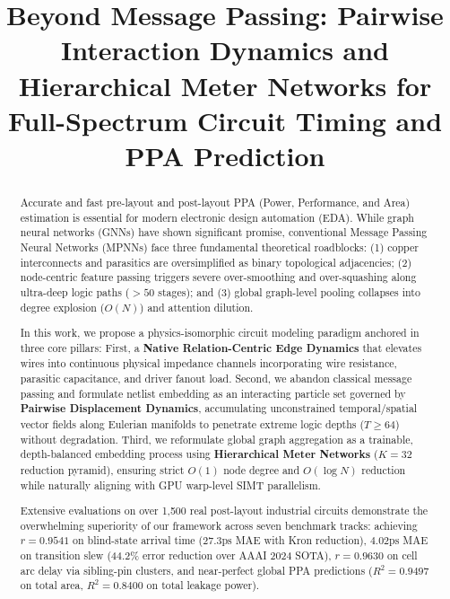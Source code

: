 \documentclass[conference]{IEEEtran}
\begin{document}
\title{Beyond Message Passing: Pairwise Interaction Dynamics and Hierarchical Meter Networks for Full-Spectrum Circuit Timing and PPA Prediction}

\author{}

\maketitle

\begin{abstract}
Accurate and fast pre-layout and post-layout PPA (Power, Performance, and Area) estimation is essential for modern electronic design automation (EDA). While graph neural networks (GNNs) have shown significant promise, conventional Message Passing Neural Networks (MPNNs) face three fundamental theoretical roadblocks: (1) copper interconnects and parasitics are oversimplified as binary topological adjacencies; (2) node-centric feature passing triggers severe over-smoothing and over-squashing along ultra-deep logic paths ($>50$ stages); and (3) global graph-level pooling collapses into degree explosion ($O(N)$) and attention dilution.

In this work, we propose a physics-isomorphic circuit modeling paradigm anchored in three core pillars:
First, a \textbf{Native Relation-Centric Edge Dynamics} that elevates wires into continuous physical impedance channels incorporating wire resistance, parasitic capacitance, and driver fanout load.
Second, we abandon classical message passing and formulate netlist embedding as an interacting particle set governed by \textbf{Pairwise Displacement Dynamics}, accumulating unconstrained temporal/spatial vector fields along Eulerian manifolds to penetrate extreme logic depths ($T \ge 64$) without degradation.
Third, we reformulate global graph aggregation as a trainable, depth-balanced embedding process using \textbf{Hierarchical Meter Networks} ($K=32$ reduction pyramid), ensuring strict $O(1)$ node degree and $O(\log N)$ reduction while naturally aligning with GPU warp-level SIMT parallelism.

Extensive evaluations on over 1,500 real post-layout industrial circuits demonstrate the overwhelming superiority of our framework across seven benchmark tracks: achieving $r = 0.9541$ on blind-state arrival time ($27.3\text{ps}$ MAE with Kron reduction), $4.02\text{ps}$ MAE on transition slew (44.2\% error reduction over AAAI 2024 SOTA), $r = 0.9630$ on cell arc delay via sibling-pin clusters, and near-perfect global PPA predictions ($R^2 = 0.9497$ on total area, $R^2 = 0.8400$ on total leakage power).
\end{abstract}
\end{document}
